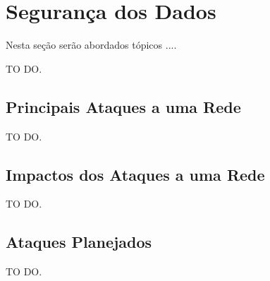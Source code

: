 \chapter{Segurança dos Dados}
\label{chap:Seguranca}
	
	Nesta seção serão abordados tópicos ....

	TO DO.

	\section{Principais Ataques a uma Rede}
	\label{sec:Seguranca_PA}

		TO DO.

	\section{Impactos dos Ataques a uma Rede}
	\label{sec:Seguranca_Impactos}

		TO DO.

	\section{Ataques Planejados}
	\label{sec:Seguranca_Planejamento}

		TO DO.

